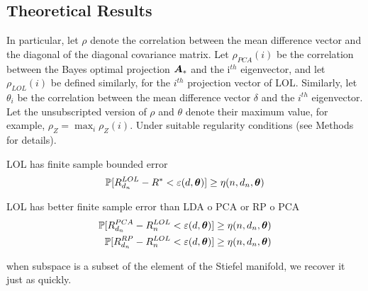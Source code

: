 \documentclass[10pt]{article}
\begin{document}



\subsection{Theoretical Results}




In particular, let $\rho$ denote the correlation between the mean difference vector and the diagonal of the diagonal covariance matrix.
Let $\rho_{PCA}(i)$ be the correlation between the Bayes optimal projection $\boldsymbol{A}_*$ and the i$^{th}$ eigenvector, and let $\rho_{LOL}(i)$ be defined similarly, for the $i^{th}$ projection vector of LOL.  Similarly, 
let $\theta_i$ be the correlation between the mean difference vector $\delta$ and the $i^{th}$ eigenvector.
Let the unsubscripted version of $\rho$ and $\theta$ denote their maximum value, for example, $\rho_{Z}=\max_i \rho_{Z}(i)$.  
Under suitable regularity conditions (see Methods for details).


\begin{thm}

LOL has finite sample bounded error	
	\begin{align}
\mathbb{P} [R^{LOL}_{d_n} - R^* < \varepsilon(d,\boldsymbol{\theta})] \ge \eta(n,d_n, \boldsymbol{\theta})
\end{align}

\end{thm}


\begin{thm}

LOL has better finite sample error than LDA o PCA or RP o PCA
\begin{align}
		\mathbb{P} [R^{PCA}_{d_n} - R^{LOL}_n &< \varepsilon(d,\boldsymbol{\theta})] \ge \eta(n,d_n, \boldsymbol{\theta}) \\
		\mathbb{P} [R^{RP}_{d_n} - R^{LOL}_n &< \varepsilon(d,\boldsymbol{\theta})] \ge \eta(n,d_n, \boldsymbol{\theta}) \\
\end{align}

\end{thm}


\begin{thm}
when subspace is a subset of the element of the Stiefel manifold, we recover it just as quickly.
\end{thm}
\end{document}

